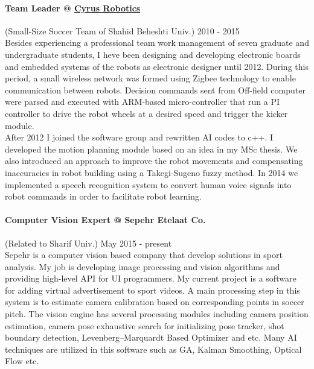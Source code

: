 \documentclass[10pt]{res}
\begin{document}
\begin{resume}
\paragraph{Team Leader @ \href{http://robocup.sbu.ac.ir}{Cyrus Robotics}}(Small-Size Soccer Team of Shahid Beheshti Univ.) \hfill 2010 - 2015\\
Besides experiencing a professional team work management of seven graduate and undergraduate students, I heve been designing and developing electronic boards and embedded systems of the robots as electronic designer until 2012. During this period, a small wireless network was formed using Zigbee technology to enable communication between robots. Decision commands sent from Off-field computer were parsed and executed with ARM-based micro-controller that run a PI controller to  drive the robot wheels at a desired speed and trigger the kicker module.\\
After 2012 I joined the software group and rewritten AI codes to c++. I developed the motion planning module based on an idea in my MSc thesis. We also introduced an approach to improve the robot movements and compensating inaccuracies in robot building using a Takegi-Sugeno fuzzy method.
In 2014 we implemented a speech recognition system to convert human voice signals into robot commands in order to facilitate robot learning.

\paragraph{Computer Vision Expert @ Sepehr Etelaat Co.} (Related to Sharif Univ.) \hfill May 2015 - present\\
Sepehr is a computer vision based company that develop solutions in sport analysis. My job is developing image processing and vision algorithms and providing high-level API for UI programmers. My current project is a software for adding virtual advertisement to sport videos. A main processing step in this system is to estimate camera calibration based on corresponding points in soccer pitch. The vision engine has several processing modules including camera position estimation, camera pose exhaustive search for initializing pose tracker, shot boundary detection, Levenberg–Marquardt Based Optimizer and etc. Many AI techniques are utilized in this software such as GA, Kalman Smoothing, Optical Flow etc.


\end{resume}
\end{document}
